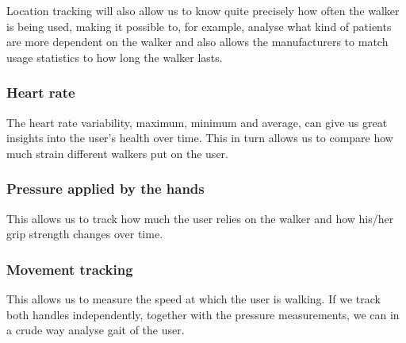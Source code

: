 Location tracking will also allow us to know quite precisely how often the walker is being used, making it possible to, for example, analyse what kind of patients are more dependent on the walker and also allows the manufacturers to match usage statistics to how long the walker lasts.

\subsubsection{Heart rate}
The heart rate variability, maximum, minimum and average, can give us great insights into the user’s health over time. This in turn allows us to compare how much strain different walkers put on the user.

\subsubsection{Pressure applied by the hands}
This allows us to track how much the user relies on the walker and how his/her grip strength changes over time.

\subsubsection{Movement tracking}
This allows us to measure the speed at which the user is walking. If we track both handles independently, together with the pressure measurements, we can in a crude way analyse gait of the user.



